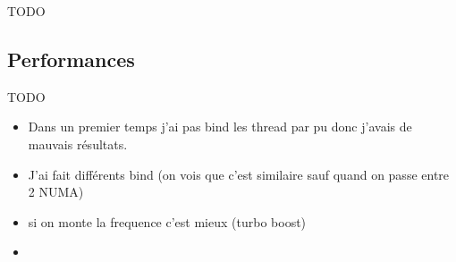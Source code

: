 TODO

\subsection{Performances}

TODO

\begin{itemize}
  \item Dans un premier temps j'ai pas bind les thread par pu donc j'avais de mauvais résultats.
  \item J'ai fait différents bind (on vois que c'est similaire sauf quand on passe entre 2 NUMA)
  \item si on monte la frequence c'est mieux (turbo boost)
  \item 
\end{itemize}
